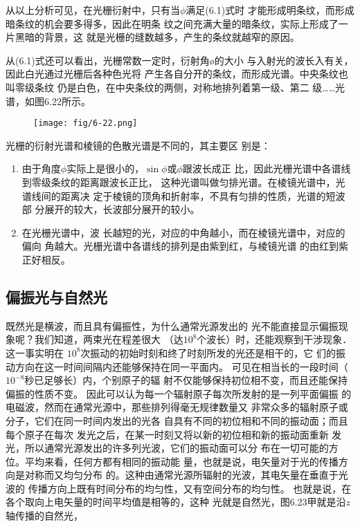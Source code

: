 从以上分析可见，在光栅衍射中，只有当$\phi$满足(6.1)式时
才能形成明条纹，而形成暗条纹的机会要多得多，因此在明条
纹之间充满大量的暗条纹，实际上形成了一片黑暗的背景，这
就是光栅的缝数越多，产生的条纹就越窄的原因。

从(6.1)式还可以看出，光栅常数一定时，衍射角ø的大小
与入射光的波长入有关，因此白光通过光栅后各种色光将
产生各自分开的条纹，而形成光谱。中央条纹也叫零级条纹
仍是白色，在中央条纹的两侧，对称地排列着第一级、第二
级……光谱，如图6.22所示。

\begin{figure}[htp]
    \centering
     \texttt{[image: fig/6-22.png]}
    \caption{}
\end{figure}

光栅的衍射光谱和棱镜的色散光谱是不同的，其主要区
别是：
\begin{enumerate}
\item 由于角度$\phi$实际上是很小的，$\sin\phi$或$\phi$跟波长成正
比，因此光栅光谱中各谱线到零级条纹的距离跟波长正比，
这种光谱叫做匀排光谱。在棱镜光谱中，光谱线间的距离决
定于棱镜的顶角和折射率，不具有匀排的性质，光谱的短波部
分展开的较大，长波部分展开的较小。
\item 在光栅光谱中，波
长越短的光，对应的中角越小，而在棱镜光谱中，对应的偏向
角越大。光栅光谱中各谱线的排列是由紫到红，与棱镜光谱
的由红到紫正好相反。
\end{enumerate}

\subsection{偏振光与自然光}
既然光是横波，而且具有偏振性，为什么通常光源发出的
光不能直接显示偏振现象呢？我们知道，两束光在程差很大
（达$10^{8}$个波长）时，还能观察到干涉现象．这一事实明在
$10^{8}$次振动的初始时刻和终了时刻所发的光还是相干的，它
们的振动方向在这一时间间隔内还能够保持在同一平面内。
可见在相当长的一段时间（$10^{-8}$秒已足够长）内，个别原子的辐
射不仅能够保持初位相不变，而且还能保持偏振的性质不变。
因此可以认为每一个辐射原子每次所发射的是一列平面偏振
的电磁波，然而在通常光源中，那些排列得毫无规律数量又
非常众多的辐射原子或分子，它们在同一时间内发出的光各
自具有不同的初位相和不同的振动面；而且每个原子在每次
发光之后，在某一时刻又将以新的初位相和新的振动面重新
发光，所以通常光源发出的许多列光波，它们的振动面可以分
布在一切可能的方位。平均来看，任何方都有相同的振动能
量，也就是说，电矢量对于光的传播方向是对称而又均匀分布
的。这种由通常光源所辐射的光波，其电矢量在垂直于光波的
传播方向上既有时间分布的均匀性，又有空间分布的均匀性。
也就是说，在各个取向上电矢量的时间平均值是相等的，这种
光就是自然光，图6.23甲就是沿$z$轴传播的自然光，

